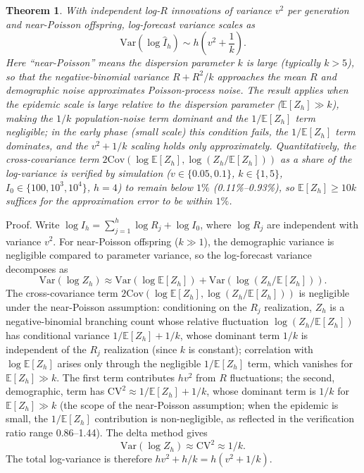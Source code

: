 \documentclass[review]{elsarticle}
\theoremstyle{plain}
\newtheorem{theorem}{Theorem}
\theoremstyle{definition}
\begin{document}
\begin{theorem}
With independent log-$R$ innovations of variance $v^2$ per generation and near-Poisson offspring, log-forecast variance scales as
\begin{equation}
\text{Var}(\log \hat{I}_h) \sim h\left(v^2 + \frac{1}{k}\right).
\end{equation}
Here ``near-Poisson'' means the dispersion parameter $k$ is large (typically $k > 5$), so that the negative-binomial variance $R + R^2/k$ approaches the mean $R$ and demographic noise approximates Poisson-process noise. The result applies when the epidemic scale is large relative to the dispersion parameter ($\mathbb{E}[Z_h] \gg k$), making the $1/k$ population-noise term dominant and the $1/\mathbb{E}[Z_h]$ term negligible; in the early phase (small scale) this condition fails, the $1/\mathbb{E}[Z_h]$ term dominates, and the $v^2 + 1/k$ scaling holds only approximately. Quantitatively, the cross-covariance term $2\text{Cov}(\log \mathbb{E}[Z_h], \log(Z_h/\mathbb{E}[Z_h]))$ as a share of the log-variance is verified by simulation ($v \in \{0.05, 0.1\}$, $k \in \{1, 5\}$, $I_0 \in \{100, 10^3, 10^4\}$, $h = 4$) to remain below $1\%$ (0.11\%--0.93\%), so $\mathbb{E}[Z_h] \geq 10k$ suffices for the approximation error to be within $1\%$.
\end{theorem}

Proof. Write $\log I_h = \sum_{j=1}^h \log R_j + \log I_0$, where $\log R_j$ are independent with variance $v^2$. For near-Poisson offspring ($k \gg 1$), the demographic variance is negligible compared to parameter variance, so the log-forecast variance decomposes as
\begin{equation}
\text{Var}(\log Z_h) \approx \text{Var}(\log \mathbb{E}[Z_h]) + \text{Var}(\log(Z_h/\mathbb{E}[Z_h])).
\end{equation}
The cross-covariance term $2\text{Cov}(\log \mathbb{E}[Z_h], \log(Z_h/\mathbb{E}[Z_h]))$ is negligible under the near-Poisson assumption: conditioning on the $R_j$ realization, $Z_h$ is a negative-binomial branching count whose relative fluctuation $\log(Z_h/\mathbb{E}[Z_h])$ has conditional variance $1/\mathbb{E}[Z_h] + 1/k$, whose dominant term $1/k$ is independent of the $R_j$ realization (since $k$ is constant); correlation with $\log \mathbb{E}[Z_h]$ arises only through the negligible $1/\mathbb{E}[Z_h]$ term, which vanishes for $\mathbb{E}[Z_h] \gg k$. The first term contributes $h v^2$ from $R$ fluctuations; the second, demographic, term has $\text{CV}^2 \approx 1/\mathbb{E}[Z_h] + 1/k$, whose dominant term is $1/k$ for $\mathbb{E}[Z_h] \gg k$ (the scope of the near-Poisson assumption; when the epidemic is small, the $1/\mathbb{E}[Z_h]$ contribution is non-negligible, as reflected in the verification ratio range 0.86--1.44). The delta method gives
\begin{equation}
\text{Var}(\log Z_h) \approx \text{CV}^2 \approx 1/k.
\end{equation}
The total log-variance is therefore $h v^2 + h/k = h(v^2 + 1/k)$.
\end{document}

